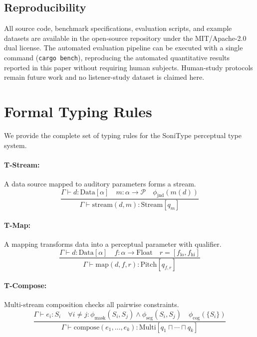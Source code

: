 \documentclass[sigchi, nonacm]{acmart}
\begin{document}
\subsection{Reproducibility}

All source code, benchmark specifications, evaluation scripts, and example datasets are available in the open-source repository under the MIT/Apache-2.0 dual license. The automated evaluation pipeline can be executed with a single command (\texttt{cargo bench}), reproducing the automated quantitative results reported in this paper without requiring human subjects. Human-study protocols remain future work and no listener-study dataset is claimed here.

\appendix

\section{Formal Typing Rules}
\label{sec:appendix_typing}

We provide the complete set of typing rules for the SoniType perceptual type system.

\paragraph{T-Stream:} A data source mapped to auditory parameters forms a stream.
\begin{equation}
\frac{\Gamma \vdash d : \mathrm{Data}[\alpha] \quad m : \alpha \to \mathcal{P} \quad \phi_\mathrm{jnd}(m(d))}{\Gamma \vdash \mathrm{stream}(d, m) : \mathrm{Stream}[q_m]}
\end{equation}

\paragraph{T-Map:} A mapping transforms data into a perceptual parameter with qualifier.
\begin{equation}
\frac{\Gamma \vdash d : \mathrm{Data}[\alpha] \quad f : \alpha \to \mathrm{Float} \quad r = [f_\mathrm{lo}, f_\mathrm{hi}]}{\Gamma \vdash \mathrm{map}(d, f, r) : \mathrm{Pitch}[q_{f,r}]}
\end{equation}

\paragraph{T-Compose:} Multi-stream composition checks all pairwise constraints.
\begin{equation}
\frac{\Gamma \vdash e_i : S_i \quad \forall i \neq j: \phi_\mathrm{mask}(S_i, S_j) \wedge \phi_\mathrm{seg}(S_i, S_j) \quad \phi_\mathrm{cog}(\{S_i\})}{\Gamma \vdash \mathrm{compose}(e_1, \ldots, e_k) : \mathrm{Multi}[q_1 \sqcap \cdots \sqcap q_k]}
\end{equation}
\end{document}
